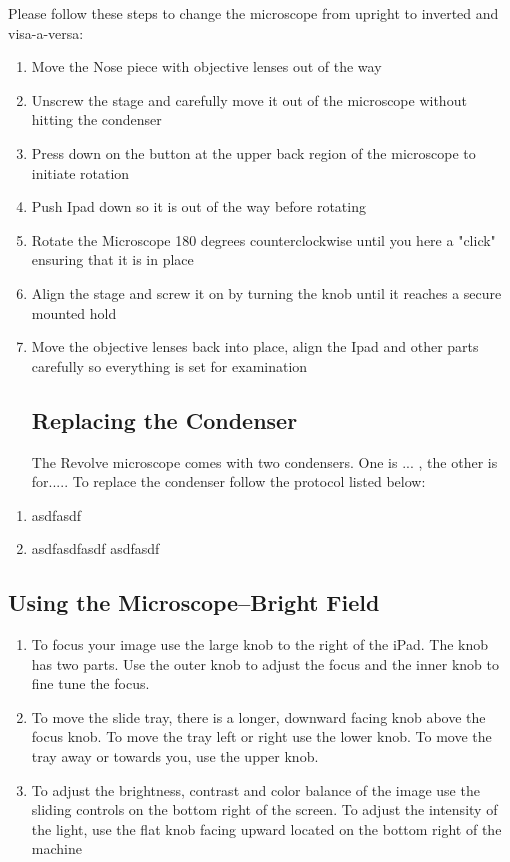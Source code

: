 \documentclass{article}
\begin{document}
Please follow these steps to change the microscope from upright to inverted and visa-a-versa:
\begin{enumerate}
  \item Move the Nose piece with objective lenses out of the way
  \item Unscrew the stage and carefully move it out of the microscope without hitting the condenser 
  \item Press down on the button at the upper back region of the microscope to initiate rotation 
  \item Push Ipad down so it is out of the way before rotating
  \item Rotate the Microscope 180 degrees counterclockwise until you here a "click" ensuring that it is in place
  \item Align the stage and screw it on by turning the knob until it reaches a secure mounted hold
  \item Move the objective lenses back into place, align the Ipad and other parts carefully so everything is set for examination 
  
  \subsection{Replacing the Condenser}
  The Revolve microscope comes with two condensers. One is ... , the other is for..... To replace the condenser follow the protocol listed below: 
\end{enumerate}


\begin{enumerate}
  \item asdfasdf
  \item asdfasdfasdf asdfasdf
\end{enumerate}

\subsection{Using the Microscope--Bright Field} 

\begin{enumerate}
  \item To focus your image use the large knob to the right of the iPad. The knob has two parts. Use the outer knob to adjust the focus and the inner knob to fine tune the focus.
  \item To move the slide tray, there is a longer, downward facing knob above the focus knob. To move the tray left or right use the lower knob. To move the tray away or towards you, use the upper knob.
  \item To adjust the brightness, contrast and color balance of the image use the sliding controls on the bottom right of the screen. To adjust the intensity of the light, use the flat knob facing upward located on the bottom right of the machine
  
\end{enumerate}
\end{document}

